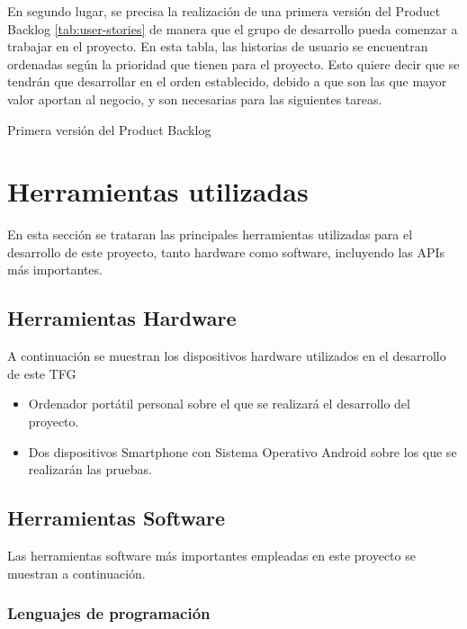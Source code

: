 En segundo lugar, se precisa la realización de una primera versión del Product Backlog \ref{tab:user-stories} de manera que el grupo de desarrollo pueda comenzar a trabajar en el proyecto. En esta tabla, las historias de usuario se encuentran ordenadas según la prioridad que tienen para el proyecto. Esto quiere decir que se tendrán que desarrollar en el orden establecido, debido a que son las que mayor valor aportan al negocio, y son necesarias para las siguientes tareas.

\begin{table}[hp]
  \centering
  {\small
  
  }
  \caption[Primera versión del Product Backlog]
  {Primera versión del Product Backlog}
  \label{tab:user-stories}
\end{table}






\section{Herramientas utilizadas}

En esta sección se trataran las principales herramientas utilizadas para el desarrollo de este proyecto, tanto hardware como software, incluyendo las \acs{API}s más importantes.

\subsection{Herramientas Hardware}

A continuación se muestran los dispositivos hardware utilizados en el desarrollo de este \ac{TFG}
\begin{itemize}
\item Ordenador portátil personal sobre el que se realizará el desarrollo del proyecto.
\item Dos dispositivos Smartphone con Sistema Operativo Android sobre los que se realizarán las pruebas.
\end{itemize}

\subsection{Herramientas Software}

Las herramientas software más importantes empleadas en este proyecto se muestran a continuación.

\subsubsection{Lenguajes de programación}


